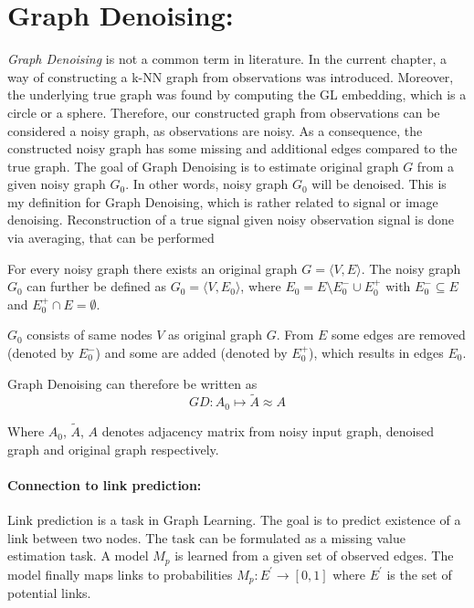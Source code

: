 \section{Graph Denoising:}
\textit{Graph Denoising} is not a common term in literature.
In the current chapter, a way of constructing a k-NN graph from observations was introduced.
Moreover, the underlying true graph was found by computing the GL embedding, which is a circle or a sphere.
Therefore, our constructed graph from observations can be considered a noisy graph, 
as observations are noisy. 
As a consequence, the constructed noisy graph has some missing and additional edges compared to the true graph.
The goal of Graph Denoising is to estimate original graph $G$ from a given noisy graph $G_0$.
In other words, noisy graph $G_0$ will be denoised.
This is my definition for Graph Denoising, which is rather related to signal or image denoising.
Reconstruction of a true signal given noisy observation signal is done via averaging, that can be performed

For every noisy graph there exists an original graph $G = \langle V,E \rangle$.
The noisy graph $G_0$ can further be defined as $G_0 = \langle V, E_0 \rangle$,  
 where $E_0 = E \setminus  E^{-}_0 \cup  E^{+}_0$ with $E^{-}_0 \subseteq E$ and $E^{+}_0 \cap E = \emptyset$.

$G_0$ consists of same nodes $V$ as original graph $G$. 
From $E$ some edges are removed (denoted by $E^{-}_0$) and some are added
(denoted by $E^{+}_0$), which results in edges $E_0$.

Graph Denoising can therefore be written as 
\begin{equation}
    GD: A_0 \mapsto \tilde{A} \approx A
\end{equation}

Where $A_0$, $\tilde{A}$, $A$ denotes adjacency matrix from noisy input graph, denoised graph and original graph respectively.


\paragraph{Connection to link prediction:}
Link prediction is a task in Graph Learning. 
The goal is to predict existence of a link between two nodes.
The task can be formulated as a missing value estimation task. A model $M_p$ is learned
from a given set of observed edges. The model finally maps links to probabilities
$M_p : E^{\prime} \rightarrow [0,1]$ where $E^{\prime}$ is the set of potential links.

